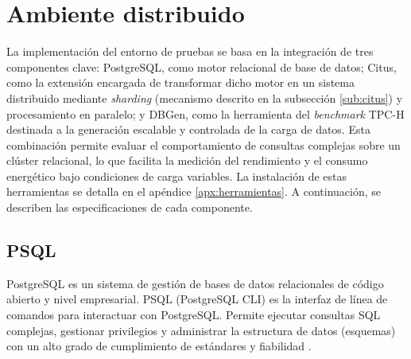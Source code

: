 \documentclass[12pt, letter paper]{report}
\begin{document}
    \section{Ambiente distribuido} %
    \label{sec:ambiente_distribuido}
      La implementación del entorno de pruebas se basa en la integración de tres
      componentes clave: PostgreSQL, como motor relacional de base de datos;
      Citus, como la extensión encargada de transformar dicho motor en un
      sistema distribuido mediante \textit{sharding} (mecanismo descrito en la
      subsección \ref{sub:citus}) y procesamiento en paralelo; y DBGen, como la
      herramienta del \textit{benchmark} TPC-H destinada a la generación
      escalable y controlada de la carga de datos. Esta combinación permite
      evaluar el comportamiento de consultas complejas sobre un clúster
      relacional, lo que facilita la medición del rendimiento y el consumo
      energético bajo condiciones de carga variables. La instalación de estas
      herramientas se detalla en el apéndice \ref{apx:herramientas}. A
      continuación, se describen las especificaciones de cada componente.

      \subsection{PSQL} %
      \label{sub:psql}
        PostgreSQL es un sistema de gestión de bases de datos relacionales de
        código abierto y nivel empresarial. PSQL (PostgreSQL CLI) es la interfaz
        de línea de comandos para interactuar con PostgreSQL. Permite ejecutar
        consultas SQL complejas, gestionar privilegios y administrar la
        estructura de datos (esquemas) con un alto grado de cumplimiento de
        estándares y fiabilidad \cite{postgresql_manual}.
\end{document}
